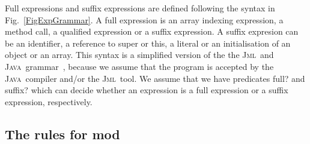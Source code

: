\documentclass[a4paper]{llncs}
\newcommand{\jml}{\textsc{Jml}}
\newcommand{\java}{\textsc{Java}}
\begin{document}
Full expressions and suffix expressions are defined following the
syntax in Fig.~\ref{FigExpGrammar}. A full expression is an array
indexing expression, a method call, a qualified expression or a suffix
expression. A suffix expresion can be an identifier, a reference to
super or this, a literal or an initialisation of an object or an
array.  This syntax is a simplified version of the the \jml\ and
\java\ grammar~\cite{LeavensBR00,GoslingJSB00}, because we assume that
the program is accepted by the \java\ compiler and/or the
\jml\ tool.%
We assume that we have predicates \textsf{full?} and
\textsf{suffix?} which can decide whether an expression is a full
expression or a suffix expression, respectively.



%




\subsection{The rules for \textsf{mod}}
\end{document}
